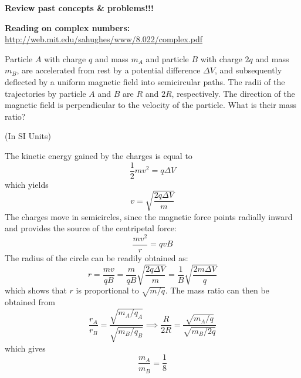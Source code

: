 \documentclass{esg8022pset}
\begin{document}
\begin{ForPSet}
  \noindent \textbf{Review past concepts \& problems!!!}

  \noindent \textbf{Reading on complex numbers:} \url{http://web.mit.edu/sahughes/www/8.022/complex.pdf}
\end{ForPSet}

\begin{problem}{}
  Particle $A$ with charge $q$ and mass $m_A$ and particle $B$ with charge $2q$ and mass $m_B$, are accelerated from rest by a potential difference $\Delta V$, and subsequently deflected by a uniform magnetic field into semicircular paths. The radii of the trajectories by particle $A$ and $B$ are $R$ and $2R$, respectively. The direction of the magnetic field is perpendicular to the velocity of the particle. What is their mass ratio?
\end{problem}
\begin{solution}
  (In SI Units)

  The kinetic energy gained by the charges is equal to 
  $$\frac12 mv^2 = q\Delta V$$
  which yields
  $$v = \sqrt{\frac{2q \Delta V}{m}}$$
  The charges move in semicircles, since the magnetic force points radially inward and provides the source of the centripetal force:
  $$\frac{mv^2}{r} = qvB$$
  The radius of the circle can be readily obtained as:
  $$r = \frac{mv}{qB} = \frac{m}{qB}\sqrt{\frac{2q\Delta V}{m}} = \frac{1}{B}\sqrt{\frac{2m\Delta V}{q}}$$
  which shows that $r$ is proportional to $\sqrt{m/q}$. The mass ratio can then be obtained from
  $$\frac{r_A}{r_B} = \frac{\sqrt{m_A / q_A}}{\sqrt{m_B / q_B}} \implies \frac{R}{2R} = \frac{\sqrt{m_A / q}}{\sqrt{m_B / 2q}}$$
  which gives
  $$\frac{m_A}{m_B} = \frac18$$
\end{solution}
\end{document}
